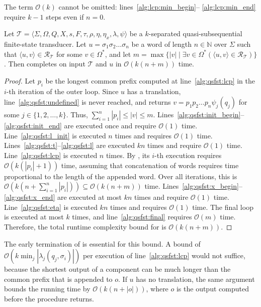 The term $\mathcal{O}(k)$ cannot be omitted: lines~\ref{alg:lcp:min_begin}--%
\ref{alg:lcp:min_end} require $k - 1$ steps even if $n = 0$.

\begin{proposition}
  Let $\mathcal{T} = \langle \Sigma, \Omega, Q, X, s, F, \tau, \rho, \eta, \eta_x,
  \lambda, \psi \rangle$ be a $k$-separa\-ted quasi-subsequential finite-state
  transducer. Let $u = \sigma_1 \sigma_2 \ldots \sigma_n$ be a word of length $n \in
  \mathbb{N}$ over $\Sigma$ such that $\langle u, v \rangle \in \mathcal{R}_\mathcal{T}$
  for some $v \in \Omega^*$, and let $m = \max \{ |v| \mid \exists v \in \Omega^* (
  \langle u, v \rangle \in \mathcal{R}_\mathcal{T}) \}$. Then
   completes on input $\mathcal{T}$ and $u$ in
  $\mathcal{O}(k(n+m))$ time.
\end{proposition}

\begin{proof}
  Let $p_i$ be the longest common prefix computed at line~\ref{alg:qsfst:lcp} in the
  $i$-th iteration of the outer loop. Since $u$ has a translation,
  line~\ref{alg:qsfst:undefined} is never reached, and 
  returns $v = p_1 p_2 \ldots p_n \psi_j(q_j)$ for some $j \in \{ 1, 2, \ldots, k \}$.
  Thus, $\sum_{i=1}^n |p_i| \leq |v| \leq m$.
  Lines~\ref{alg:qsfst:init_begin}--\ref{alg:qsfst:init_end} are executed once and
  require $\mathcal{O}(1)$ time.
  Line~\ref{alg:qsfst:l_init} is executed $n$ times and requires $\mathcal{O}(1)$ time.
  Lines~\ref{alg:qsfst:t}--\ref{alg:qsfst:l} are executed $kn$ times and require
  $\mathcal{O}(1)$ time.
  Line~\ref{alg:qsfst:lcp} is executed $n$ times. By , its
  $i$-th execution requires $\mathcal{O}(k(|p_i| + 1))$ time, assuming that
  concatenation of words requires time proportional to the length of the appended
  word. Over all iterations, this is $\mathcal{O}(k(n + \sum_{i=1}^n |p_i|)) \subseteq
  \mathcal{O}(k(n + m))$ time.
  Lines~\ref{alg:qsfst:x_begin}--\ref{alg:qsfst:x_end} are executed at most $kn$
  times and require $\mathcal{O}(1)$ time.
  Line~\ref{alg:qsfst:eta} is executed $kn$ times and requires $\mathcal{O}(1)$ time.
  The final loop is executed at most $k$ times, and line~\ref{alg:qsfst:final}
  requires $\mathcal{O}(m)$ time.
  Therefore, the total runtime complexity bound for  is
  $\mathcal{O}(k(n+m))$.
\end{proof}

The early termination of  is essential for this bound. A bound of
$\mathcal{O}(k \min_j |\lambda_j(q_j, \sigma_i)|)$ per execution of
line~\ref{alg:qsfst:lcp} would not suffice, because the shortest output of a
component can be much longer than the common prefix that is appended to $o$. If $u$
has no translation, the same argument bounds the running time by $\mathcal{O}(k(n +
|o|))$, where $o$ is the output computed before the procedure returns.
